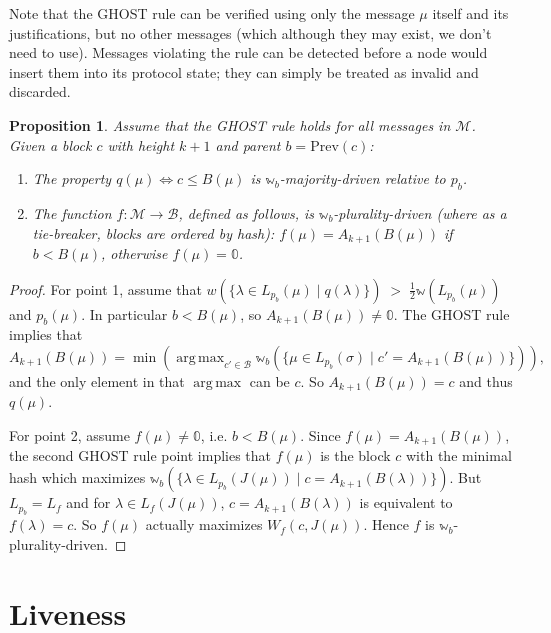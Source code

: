 \documentclass[12pt]{article}
\newtheorem{proposition}{Proposition}
\DeclareMathOperator*{\argmax}{arg\,max}
\begin{document}
Note that the GHOST rule can be verified using only the message $\mu$ itself and its justifications, but no other messages (which although they may exist, we don't need to use). Messages violating the rule can be detected before a node would insert them into its protocol state; they can simply be treated as invalid and discarded.

\begin{proposition}\label{ghostPlurality}
  Assume that the GHOST rule holds for all messages in $\mathcal{M}$. Given a block $c$ with height $k + 1$ and parent $b = \mathrm{Prev}(c)$:
  \begin{enumerate}
    \item The property $q(\mu) \Leftrightarrow c \leq B(\mu)$ is $\mathbb{w}_b$-majority-driven relative to $p_b$.
    \item The function $f : \mathcal{M} \rightarrow \mathcal{B}$, defined as follows, is $\mathbb{w}_b$-plurality-driven (where as a tie-breaker, blocks are ordered by hash):
      $f(\mu) = A_{k+1}(B(\mu))$ if $b < B(\mu)$, otherwise $f(\mu) = \mathbb{0}$.
  \end{enumerate}
\end{proposition}

\begin{proof}
  For point 1, assume that $w (\{\lambda \in L_{p_b}(\mu) \mid q(\lambda) \}) \;>\; \frac{1}{2} \mathbb{w}(L_{p_b}(\mu))$ and $p_b(\mu)$. In particular $b < B(\mu)$, so $A_{k + 1} (B(\mu)) \neq \mathbb{0}$. The GHOST rule implies that
  $$A_{k + 1}(B(\mu)) = \min \left(\argmax_{c'\in\mathcal{B}} \mathbb{w}_b(\{\mu \in L_{p_b} (\sigma) \mid c' = A_{k + 1}(B(\mu))\})\right)\textrm{,}$$
  and the only element in that $\argmax$ can be $c$. So $A_{k + 1}(B(\mu)) = c$ and thus $q(\mu)$.

  For point 2, assume $f(\mu) \neq \mathbb{0}$, i.e. $b < B(\mu)$. Since $f(\mu) = A_{k+1}(B(\mu))$, the second GHOST rule point implies that $f(\mu)$ is the block $c$ with the minimal hash which maximizes $\mathbb{w}_b(\{\lambda \in L_{p_b} (J(\mu)) \mid c = A_{k + 1}(B(\lambda))\})$. But $L_{p_b} = L_f$ and for $\lambda \in L_f (J(\mu))$, $c = A_{k+1}(B(\lambda))$ is equivalent to $f(\lambda) = c$. So $f(\mu)$ actually maximizes $W_f(c, J(\mu))$. Hence $f$ is $\mathbb{w}_b$-plurality-driven.
\end{proof}


\section{Liveness}
\label{sectionLiveness}
\end{document}
